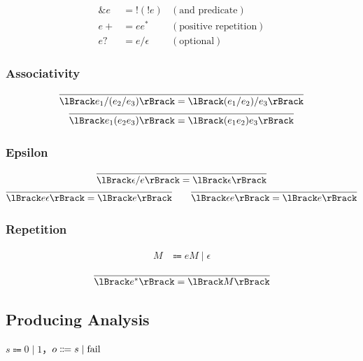 \begin{align*}
  \mathop{\&} e &= \mathop{!} (\mathop{!} e) &(\text{and predicate}) \\
  e+ &= e e^* &(\text{positive repetition}) \\
  e? &= e / \epsilon &(\text{optional})
\end{align*}

\subsubsection{Associativity}

\begin{gather*}
  \infer{\semanticf{e_1 / (e_2 / e_3)} = \semanticf{(e_1 / e_2) / e_3}}{}
  \\
  \infer{\semanticf{e_1 (e_2 e_3)} = \semanticf{(e_1 e_2) e_3}}{}
\end{gather*}

\subsubsection{Epsilon}

\begin{gather*}
  \infer{\semanticf{\epsilon / e} = \semanticf{\epsilon}}{}
  \\
  \infer{\semanticf{e \epsilon} = \semanticf{e}}{}
  \hspace{2em}
  \infer{\semanticf{\epsilon e} = \semanticf{e}}{}
\end{gather*}

\subsubsection{Repetition}

\begin{align*}
  M &\Coloneqq e M \mid \epsilon
\end{align*}

\begin{gather*}
  \infer{\semanticf{e^*} = \semanticf{M}}{}
\end{gather*}

\subsection{Producing Analysis}

$s \Coloneqq 0 \mid 1$，$o \Coloneqq s \mid \mathop{\mathrm{fail}}$

